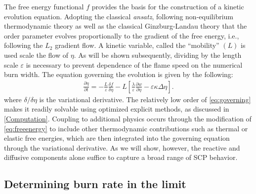 \documentclass[colorinlistoftodos,review]{elsarticle}
\begin{document}
The free energy functional $f$ provides the basis for the construction of a kinetic evolution equation. 
Adopting the classical {\it ansatz}, following non-equilibrium thermodynamic theory as well as the classical Ginzburg-Landau theory \cite {landau1950theory} that the order parameter evolves proportionally to the gradient of the free energy, i.e., following the $L_2$ gradient flow.
A kinetic variable, called the ``mobility'' $(L)$ is used scale the flow of $\eta$.
As will be shown subsequently, dividing by the length scale $\varepsilon$ is necessary to prevent dependence of the flame speed on the numerical burn width.
The equation governing the evolution is given by the following:
\begin{align}
  \frac{\partial\eta}{\partial t}
  =-\frac{L}{\varepsilon} \frac{\delta f}{\delta \eta}
  - L \left[\frac{\lambda}{\varepsilon}\frac{\partial w}{\partial \eta}-\varepsilon\kappa \Delta\eta \right].\label{eq:governing}
\end{align}
where $\delta/\delta\eta$ is the variational derivative.
The relatively low order of \cref{eq:governing} makes it readily solvable using optimized explicit methods, as discussed in \cref{Computation}.
Coupling to additional physics occurs through the modification of \cref{eq:freeenergy} to include other thermodynamic contributions such as thermal or elastic free energies, which are then integrated into the governing equation through the variational derivative.
As we will show, however, the reactive and diffusive components alone suffice to capture a broad range of SCP behavior.

\subsection{Determining burn rate in the limit}
\end{document}
